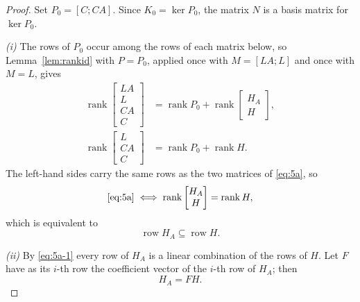 \begin{proof}
Set $P_0=[C;CA]$. Since $K_0=\ker P_0$, the matrix $N$ is a basis matrix for $\ker P_0$.

\emph{(i)} The rows of $P_0$ occur among the rows of each matrix below, so Lemma~\ref{lem:rankid} with $P=P_0$, applied once with $M=[LA;L]$ and once with $M=L$, gives
\begin{equation*}
\begin{aligned}
\operatorname{rank}\begin{bmatrix}LA\\ L\\ CA\\ C\end{bmatrix}
&=\operatorname{rank}P_0+\operatorname{rank}\begin{bmatrix}H_A\\ H\end{bmatrix},\\
\operatorname{rank}\begin{bmatrix}L\\ CA\\ C\end{bmatrix}
&=\operatorname{rank}P_0+\operatorname{rank}H .
\end{aligned}
\end{equation*}
The left-hand sides carry the same rows as the two matrices of \eqref{eq:5a}, so
\begin{equation*}
\eqref{eq:5a}
\iff
\operatorname{rank}\begin{bmatrix}H_A\\ H\end{bmatrix}=\operatorname{rank}H ,
\end{equation*}
which is equivalent to
\begin{equation}\label{eq:5a-1}
\operatorname{row}H_A\subseteq\operatorname{row}H .
\end{equation}

\emph{(ii)} By \eqref{eq:5a-1} every row of $H_A$ is a linear combination of the rows of $H$. Let $F$ have as its $i$-th row the coefficient vector of the $i$-th row of $H_A$; then
\begin{equation}\label{eq:5a-2}
H_A=FH .
\end{equation}


\end{proof}
